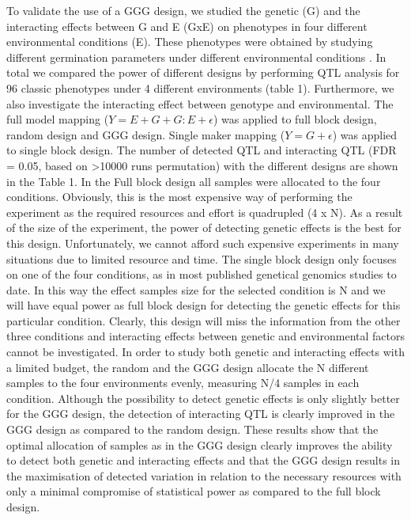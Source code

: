 To validate the use of a GGG design, we studied the genetic (G) and the interacting effects between G and E (GxE) 
on phenotypes in four different environmental conditions (E). These phenotypes were obtained by studying different 
germination parameters under different environmental conditions \cite{Joosen:2011}. In total we compared the 
power of different designs by performing QTL analysis for 96 classic phenotypes under 4 different environments 
\cite{Joosen:2011} (table 1).  Furthermore, we also investigate the interacting effect between genotype and 
environmental. The full model mapping ($Y = E + G + G:E + \epsilon$) was applied to full block design, random design and GGG 
design. Single maker mapping ($Y = G + \epsilon$) was applied to single block design. The number of detected QTL and interacting 
QTL (FDR = 0.05, based on >10000 runs permutation) with the different designs are shown in the Table 1.  In the Full 
block design  all samples were allocated to the four conditions.  Obviously, this is the most expensive way of performing 
the experiment as the required resources and effort is quadrupled (4 x N).  As a result of the size of the experiment, 
the power of detecting genetic effects is the best for this design. Unfortunately, we cannot afford such expensive 
experiments in many situations due to limited resource and time. The single block design only focuses on one of the four 
conditions, as in most published genetical genomics studies to date. In this way the effect samples size for the selected 
condition is N and we will have equal power as full block design for detecting the genetic effects for this particular 
condition. Clearly, this design will miss the information from the other three conditions and interacting effects 
between genetic and environmental factors cannot be investigated. In order to study both genetic and interacting 
effects with a limited budget,  the random and the GGG design allocate the N different samples to the four environments 
evenly, measuring N/4 samples in each condition. Although the possibility to detect genetic effects is only slightly better 
for the GGG design, the detection of interacting QTL is clearly improved in the GGG design as compared to the random design. 
These results show that the optimal allocation of samples as in the GGG design clearly improves the ability to detect both 
genetic and interacting effects and that the GGG design results in the maximisation of detected variation in relation to 
the necessary resources with only a minimal compromise of statistical power as compared to the full block design.

